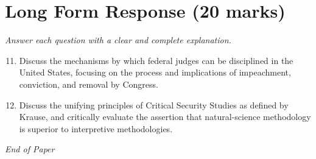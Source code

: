 \documentclass[12pt]{article}
\begin{document}
\section*{Long Form Response (20 marks)}
\textit{Answer each question with a clear and complete explanation.}
\begin{enumerate}[label=\arabic*.]
\setcounter{enumi}{10}
\item Discuss the mechanisms by which federal judges can be disciplined in the United States, focusing on the process and implications of impeachment, conviction, and removal by Congress.
\item Discuss the unifying principles of Critical Security Studies as defined by Krause, and critically evaluate the assertion that natural-science methodology is superior to interpretive methodologies.
\end{enumerate}

\vfill
\noindent\textit{End of Paper}
\end{document}
